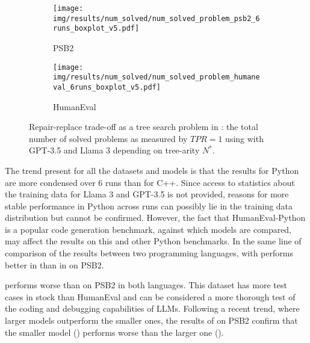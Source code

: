 \begin{figure}[bt]
\begin{subfigure}{\linewidth}
\centering
\texttt{[image: img/results/num\_solved/num\_solved\_problem\_psb2\_6runs\_boxplot\_v5.pdf]}
\vspace{-15pt}
  \caption{PSB2}
  \label{fig:num-solved-psb2-gpt3.5}
\end{subfigure}
\begin{subfigure}{\columnwidth}
\centering
\texttt{[image: img/results/num\_solved/num\_solved\_problem\_humaneval\_6runs\_boxplot\_v5.pdf]}
\vspace{-15pt}
  \caption{HumanEval}
  \label{fig:num-solved-he-gpt3.5}
\end{subfigure}
\vspace{-16pt}
\caption{Repair-replace trade-off as a tree search problem in \method{}: the total number of solved problems as measured by $TPR=1$ using \method{} with GPT-3.5 and Llama 3 depending on tree-arity $N^*$.}
\label{fig:repair-replace-trade-off-generalizability}
\end{figure}


The trend present for all the datasets and models is that the results for Python are more condensed over 6 runs than for C++. 
Since access to statistics about the training data for Llama 3 and GPT-3.5 is not provided, reasons for more stable performance in Python across runs can possibly lie in the training data distribution but cannot be confirmed. 
However, the fact that HumanEval-Python is a popular code generation benchmark, against which models are compared, may affect the results on this and other Python benchmarks.
In the same line of comparison of the results between two programming languages, \method{} with \gpt{} performs better in \py{} than in \cpp{} on PSB2. 

% 
\llama{} performs worse than \gpt{} on PSB2 in both languages.
This dataset has more test cases in stock than HumanEval and can be considered a more thorough test of the coding and debugging capabilities of LLMs. 
Following a recent trend, where larger models outperform the smaller ones, the results of \method{} on PSB2 confirm that the smaller model (\llama{}) performs worse than the larger one (\gpt{}).

